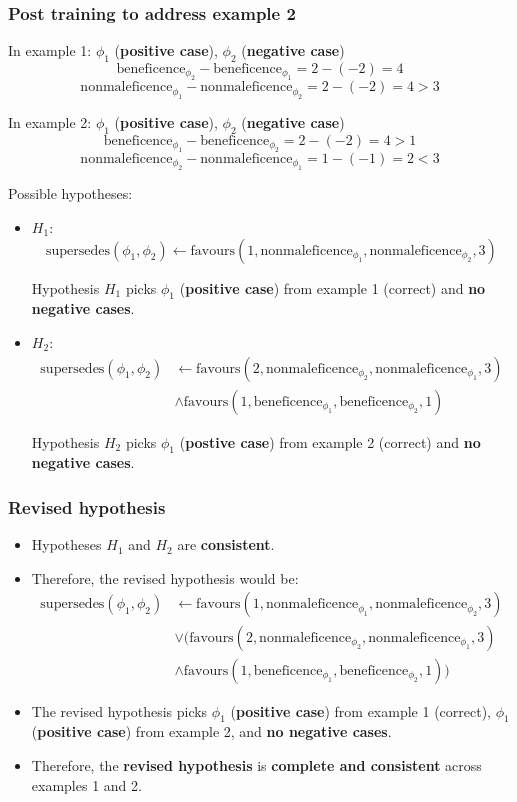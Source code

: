 \documentclass[11pt]{article}
\begin{document}
\subsubsection{Post training to address example 2}
\label{sec:orgc72d65e}
In example 1:
\(\phi_1\) (\textbf{positive case}), \(\phi_2\) (\textbf{negative case})
\[\text{beneficence}_{\phi_2} - \text{beneficence}_{\phi_1} = 2 - (-2) = 4\]
\[\text{nonmaleficence}_{\phi_1} - \text{nonmaleficence}_{\phi_2} = 2 - (-2) = 4 > 3\]

In example 2:
\(\phi_1\) (\textbf{positive case}), \(\phi_2\) (\textbf{negative case})
\[\text{beneficence}_{\phi_1} - \text{beneficence}_{\phi_2} = 2 - (-2) = 4 > 1\]
\[\text{nonmaleficence}_{\phi_2} - \text{nonmaleficence}_{\phi_1} = 1 - (-1) = 2 < 3\]

Possible hypotheses:
\begin{itemize}
\item \(H_1\):
\[\text{supersedes}(\phi_1, \phi_2) \leftarrow \text{favours}(1, \text{nonmaleficence}_{\phi_1}, \text{nonmaleficence}_{\phi_2}, 3)\]

Hypothesis \(H_1\) picks \(\phi_1\) (\textbf{positive case}) from example 1 (correct) and \textbf{no negative cases}.
\item \(H_2\):
\begin{align*}
\text{supersedes}(\phi_1, \phi_2) &\leftarrow \text{favours}(2, \text{nonmaleficence}_{\phi_2}, \text{nonmaleficence}_{\phi_1}, 3) \\
&\wedge \text{favours}(1, \text{beneficence}_{\phi_1}, \text{beneficence}_{\phi_2}, 1)
\end{align*}

Hypothesis \(H_2\) picks \(\phi_1\) (\textbf{postive case}) from example 2 (correct) and \textbf{no negative cases}.
\end{itemize}
\subsubsection{Revised hypothesis}
\label{sec:orgcdc2878}
\begin{itemize}
\item Hypotheses \(H_1\) and \(H_2\) are \textbf{consistent}.
\item Therefore, the revised hypothesis would be:
\begin{align*}
\text{supersedes}(\phi_1, \phi_2) &\leftarrow \text{favours}(1, \text{nonmaleficence}_{\phi_1}, \text{nonmaleficence}_{\phi_2}, 3) \\
&\vee (\text{favours}(2, \text{nonmaleficence}_{\phi_2}, \text{nonmaleficence}_{\phi_1}, 3) \\
&\wedge \text{favours}(1, \text{beneficence}_{\phi_1}, \text{beneficence}_{\phi_2}, 1))
\end{align*}
\item The revised hypothesis picks \(\phi_1\) (\textbf{positive case}) from example 1 (correct), \(\phi_1\) (\textbf{positive case}) from example 2, and \textbf{no negative cases}.
\item Therefore, the \textbf{revised hypothesis} is \textbf{complete and consistent} across examples 1 and 2.
\end{itemize}
\end{document}
